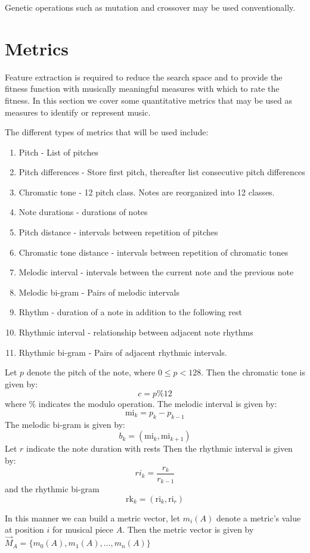 Genetic operations such as mutation and crossover may be used conventionally.

\section{Metrics} \label{chap:metrics}
Feature extraction is required to reduce the search space and to provide the fitness function with musically meaningful measures with which to rate the fitness. In this section we cover some quantitative metrics that may be used as measures to identify or represent music.

The different types of metrics that will be used include:
\begin{enumerate}
\item Pitch - List of pitches
\item Pitch differences - Store first pitch, thereafter list consecutive pitch differences
\item Chromatic tone - 12 pitch class. Notes are reorganized into 12 classes.
\item Note durations - durations of notes
\item Pitch distance - intervals between repetition of pitches
\item Chromatic tone distance - intervals between repetition of chromatic tones  
\item Melodic interval - intervals between the current note and the previous note
\item Melodic bi-gram - Pairs of melodic intervals
\item Rhythm - duration of a note in addition to the following rest
\item Rhythmic interval - relationship between adjacent note rhythms
\item Rhythmic bi-gram - Pairs of adjacent rhythmic intervals.
\end{enumerate}

Let $p$ denote the pitch of the note, where $0 \leq p < 128$.
Then the chromatic tone is given by:
\[c = p \% 12\]
where $\%$ indicates the modulo operation.
The melodic interval is given by:
\[\text{mi}_k = p_k - p_{k-1} \]
The melodic bi-gram is given by:
\[b_k = (\text{mi}_k, \text{mi}_{k+1}) \]
Let $r$ indicate the note duration with rests
Then the rhythmic interval is given by:
\[\text{}ri_k = \frac{r_k}{r_{k-1}} \]
and the rhythmic bi-gram
\[\text{rk}_k = (\text{ri}_k, \text{ri}_r) \]

In this manner we can build a metric vector, let $m_i(A)$ denote a metric's value at position $i$ for musical piece $A$. Then the metric vector is given by $\vec{M}_A = \{m_0(A), m_1(A), \ldots, m_n(A) \}$ 



